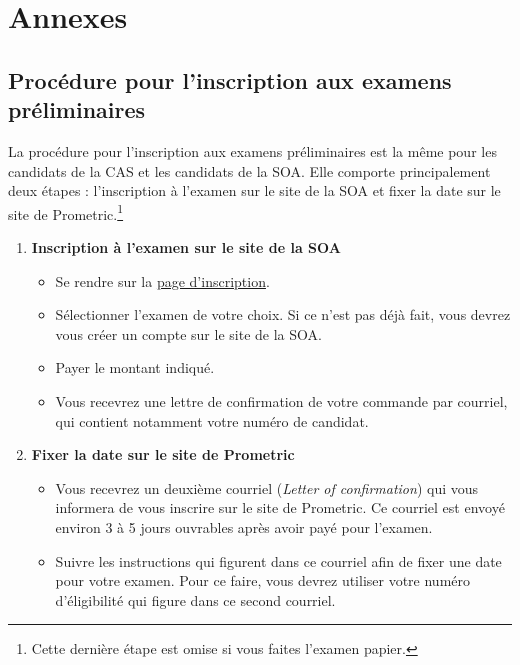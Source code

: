 \section*{Annexes}
\label{sec:annexes}

\subsection*{Procédure pour l'inscription aux examens préliminaires}
\label{subsec:inscriptionexams}
La procédure pour l'inscription aux examens préliminaires est la même pour les candidats de la CAS et les candidats de la SOA. Elle comporte principalement deux étapes : l'inscription à l'examen sur le site de la SOA et fixer la date sur le site de Prometric.\footnote{Cette dernière étape est omise si vous faites l'examen papier.}\vspace{\baselineskip} 

\begin{enumerate}
\item \textbf{Inscription à l'examen sur le site de la SOA}
\begin{itemize}
\item Se rendre sur la \href{https://www.soa.org/Education/Exam-Req/Registration/edu-registration.aspx}{page d'inscription}. 
\item Sélectionner l'examen de votre choix. Si ce n'est pas déjà fait, vous devrez vous créer un compte sur le site de la SOA.
\item Payer le montant indiqué.
\item Vous recevrez une lettre de confirmation de votre commande par courriel, qui contient notamment votre numéro de candidat.
\end{itemize}\vspace{\baselineskip}

\item \textbf{Fixer la date sur le site de Prometric}
\begin{itemize}
\item Vous recevrez un deuxième courriel (\textit{Letter of confirmation}) qui vous informera de vous inscrire sur le site de Prometric. Ce courriel est envoyé environ 3 à 5 jours ouvrables après avoir payé pour l'examen.
\item Suivre les instructions qui figurent dans ce courriel afin de fixer une date pour votre examen. Pour ce faire, vous devrez utiliser votre numéro d'éligibilité qui figure dans ce second courriel.
\end{itemize}
\end{enumerate}

